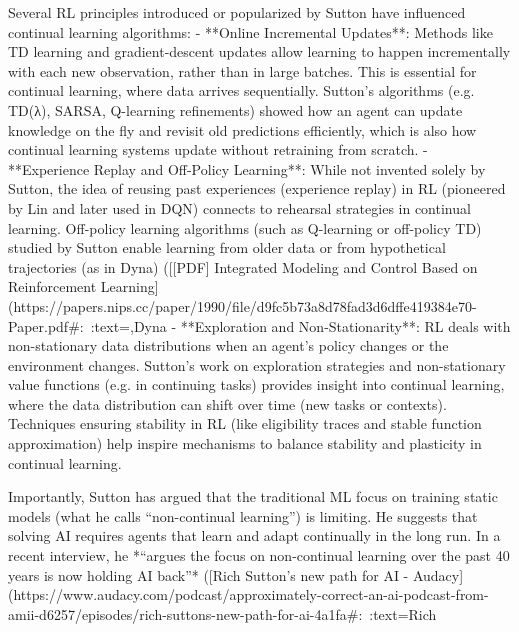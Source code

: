 Several RL principles introduced or popularized by Sutton have influenced continual learning algorithms:
- **Online Incremental Updates**: Methods like TD learning and gradient-descent updates allow learning to happen incrementally with each new observation, rather than in large batches. This is essential for continual learning, where data arrives sequentially. Sutton’s algorithms (e.g. TD(λ), SARSA, Q-learning refinements) showed how an agent can update knowledge on the fly and revisit old predictions efficiently, which is also how continual learning systems update without retraining from scratch.
- **Experience Replay and Off-Policy Learning**: While not invented solely by Sutton, the idea of reusing past experiences (experience replay) in RL (pioneered by Lin and later used in DQN) connects to rehearsal strategies in continual learning. Off-policy learning algorithms (such as Q-learning or off-policy TD) studied by Sutton enable learning from older data or from hypothetical trajectories (as in Dyna) ([[PDF] Integrated Modeling and Control Based on Reinforcement Learning](https://papers.nips.cc/paper/1990/file/d9fc5b73a8d78fad3d6dffe419384e70-Paper.pdf#:~:text=,Dyna%
- **Exploration and Non-Stationarity**: RL deals with non-stationary data distributions when an agent’s policy changes or the environment changes. Sutton’s work on exploration strategies and non-stationary value functions (e.g. in continuing tasks) provides insight into continual learning, where the data distribution can shift over time (new tasks or contexts). Techniques ensuring stability in RL (like eligibility traces and stable function approximation) help inspire mechanisms to balance stability and plasticity in continual learning.

Importantly, Sutton has argued that the traditional ML focus on training static models (what he calls “non-continual learning”) is limiting. He suggests that solving AI requires agents that learn and adapt continually in the long run. In a recent interview, he *“argues the focus on non-continual learning over the past 40 years is now holding AI back”* ([Rich Sutton's new path for AI - Audacy](https://www.audacy.com/podcast/approximately-correct-an-ai-podcast-from-amii-d6257/episodes/rich-suttons-new-path-for-ai-4a1fa#:~:text=Rich%

